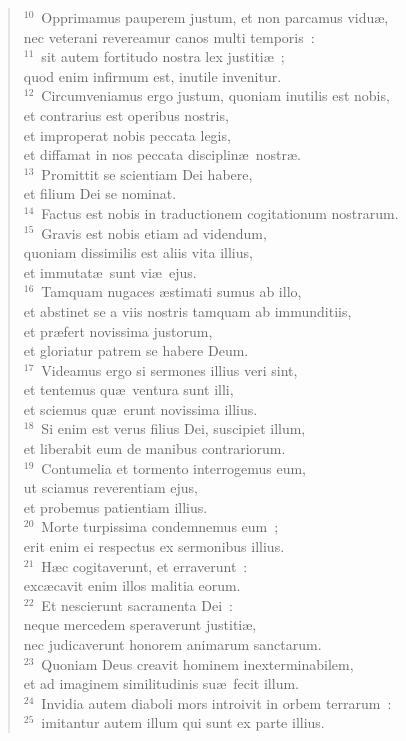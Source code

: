 \begin{flushleft}
\begin{verse}
${}^{10}$~Opprimamus pauperem justum, et non parcamus vidu\ae ,\\ nec veterani revereamur canos multi temporis~:\\
${}^{11}$~sit autem fortitudo nostra lex justiti\ae~;\\ quod enim infirmum est, inutile invenitur.\\
${}^{12}$~Circumveniamus ergo justum, quoniam inutilis est nobis,\\ et contrarius est operibus nostris,\\ et improperat nobis peccata legis,\\ et diffamat in nos peccata disciplin\ae\ nostr\ae .\\
${}^{13}$~Promittit se scientiam Dei habere,\\ et filium Dei se nominat.\\
${}^{14}$~Factus est nobis in traductionem cogitationum nostrarum.\\
${}^{15}$~Gravis est nobis etiam ad videndum,\\ quoniam dissimilis est aliis vita illius,\\ et immutat\ae\ sunt vi\ae\ ejus.\\
${}^{16}$~Tamquam nugaces \ae stimati sumus ab illo,\\ et abstinet se a viis nostris tamquam ab immunditiis,\\ et pr\ae fert novissima justorum,\\ et gloriatur patrem se habere Deum.\\
${}^{17}$~Videamus ergo si sermones illius veri sint,\\ et tentemus qu\ae\ ventura sunt illi,\\ et sciemus qu\ae\ erunt novissima illius.\\
${}^{18}$~Si enim est verus filius Dei, suscipiet illum,\\ et liberabit eum de manibus contrariorum.\\
${}^{19}$~Contumelia et tormento interrogemus eum,\\ ut sciamus reverentiam ejus,\\ et probemus patientiam illius.\\
${}^{20}$~Morte turpissima condemnemus eum~;\\ erit enim ei respectus ex sermonibus illius.\\
${}^{21}$~H\ae c cogitaverunt, et erraverunt~:\\ exc\ae cavit enim illos malitia eorum.\\
${}^{22}$~Et nescierunt sacramenta Dei~:\\ neque mercedem speraverunt justiti\ae ,\\ nec judicaverunt honorem animarum sanctarum.\\
${}^{23}$~Quoniam Deus creavit hominem inexterminabilem,\\ et ad imaginem similitudinis su\ae\ fecit illum.\\
${}^{24}$~Invidia autem diaboli mors introivit in orbem terrarum~:\\
${}^{25}$~imitantur autem illum qui sunt ex parte illius.\end{verse}\end{flushleft}
